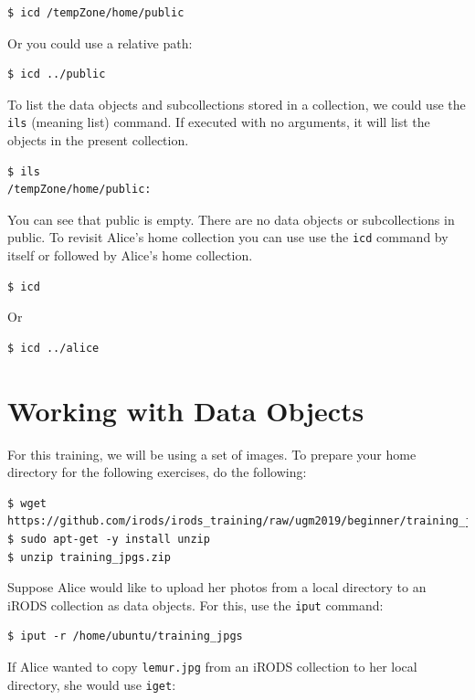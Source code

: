 \documentclass[10pt,oneside]{memoir}
\begin{document}
\begin{lstlisting}
$ icd /tempZone/home/public
\end{lstlisting}

Or you could use a relative path:

\begin{lstlisting}
$ icd ../public
\end{lstlisting}

To list the data objects and subcollections stored in a collection, we could use the \texttt{ils} (meaning list) command. If executed with no arguments, it will list the objects in the present collection.

\begin{lstlisting}
$ ils
/tempZone/home/public:
\end{lstlisting}

You can see that public is empty. There are no data objects or subcollections in public.
To revisit Alice's home collection you can use use the \texttt{icd} command by itself or followed by Alice's home collection.

\begin{lstlisting}
$ icd
\end{lstlisting}

Or

\begin{lstlisting}
$ icd ../alice
\end{lstlisting}

\section{Working with Data Objects}

For this training, we will be using a set of images. To prepare your home directory for the following exercises, do the following:

\begin{lstlisting}
$ wget https://github.com/irods/irods_training/raw/ugm2019/beginner/training_jpgs.zip
$ sudo apt-get -y install unzip
$ unzip training_jpgs.zip
\end{lstlisting}

Suppose Alice would like to upload her photos from a local directory to an iRODS collection as data objects. For this, use the \texttt{iput} command:

\begin{lstlisting}
$ iput -r /home/ubuntu/training_jpgs
\end{lstlisting}

If Alice wanted to copy \texttt{lemur.jpg} from an iRODS collection to her local directory, she would use \texttt{iget}:
\end{document}
